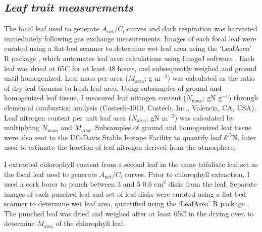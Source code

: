 \subsection{\textit{Leaf trait measurements}}
\noindent The focal leaf used to generate $A_\mathrm{net}$/$C_\mathrm{i}$ curves and dark respiration was harvested immediately following gas exchange measurements. Images of each focal leaf were curated using a flat-bed scanner to determine wet leaf area using the `LeafArea' R package , which automates leaf area calculations using ImageJ software . Each leaf was dried at 65\textdegree{}C for at least 48 hours, and subsequently weighed and ground until homogenized. Leaf mass per area ($M_\mathrm{area}$; g m$^{-2}$) was calculated as the ratio of dry leaf biomass to fresh leaf area. Using subsamples of ground and homogenized leaf tissue, I measured leaf nitrogen content ($N_\mathrm{mass}$; gN g$^{-1}$) through elemental combustion analysis (Costech-4010, Costech, Inc., Valencia, CA, USA). Leaf nitrogen content per unit leaf area ($N_\mathrm{area}$; gN m$^{-2}$) was calculated by multiplying $N_\mathrm{mass}$ and $M_\mathrm{area}$. Subsamples of ground and homogenized leaf tissue were also sent to the UC-Davis Stable Isotope Facility to quantify leaf $\delta^{15}$N, later used to estimate the fraction of leaf nitrogen derived from the atmosphere.

I extracted chlorophyll content from a second leaf in the same trifoliate leaf set as the focal leaf used to generate $A_\mathrm{net}$/$C_\mathrm{i}$ curves. Prior to chlorophyll extraction, I used a cork borer to punch between 3 and 5 0.6 cm$^2$ disks from the leaf. Separate images of each punched leaf and set of leaf disks were curated using a flat-bed scanner to determine wet leaf area, quantified using the `LeafArea' R package . The punched leaf was dried and weighed after at least 65\textdegree{}C in the drying oven to determine $M_\mathrm{area}$ of the chlorophyll leaf.
    

